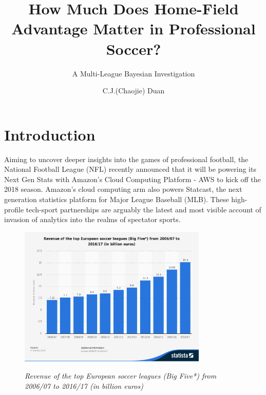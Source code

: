 \documentclass[USenglish]{article}
\begin{document}

  \author*[1]{C.J.(Chaojie) Duan}
  \title{How Much Does Home-Field Advantage Matter in Professional Soccer?}
  \subtitle{A Multi-League Bayesian Investigation}
\maketitle

\section{Introduction} 


Aiming to uncover deeper insights into the games of professional football, the National Football League (NFL) recently announced that it will be powering its Next Gen Stats with Amazon's Cloud Computing Platform - AWS to kick off the 2018 season. %
Amazon’s cloud computing arm also powers Statcast, the next generation statistics platform for Major League Baseball (MLB). These high-profile tech-sport partnerships are arguably the latest and most visible account of invasion of analytics into the realms of spectator sports.

\begin{figure}[ht]
\caption{\textit{Revenue of the top European soccer leagues (Big Five*) from 2006/07 to 2016/17 (in billion euros)}}

\centering\includegraphics[width=0.8\textwidth]{HFA11.pdf}
\label{fig11}
\end{figure}
\end{document}
